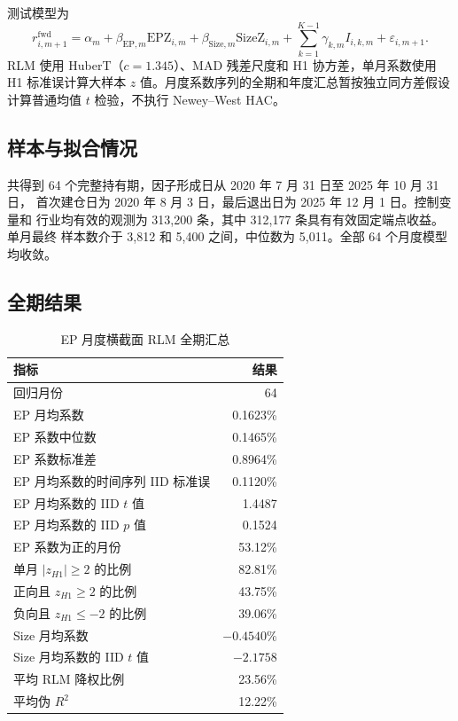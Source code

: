 \documentclass[UTF8,a4paper,11pt]{ctexart}
\begin{document}
测试模型为
\begin{equation}
  r^{\mathrm{fwd}}_{i,m+1}
  =\alpha_m+\beta_{\mathrm{EP},m}\mathrm{EPZ}_{i,m}
   +\beta_{\mathrm{Size},m}\mathrm{SizeZ}_{i,m}
   +\sum_{k=1}^{K-1}\gamma_{k,m}I_{i,k,m}
   +\varepsilon_{i,m+1}.
\end{equation}
RLM 使用 HuberT（$c=1.345$）、MAD 残差尺度和 H1 协方差，单月系数使用 H1
标准误计算大样本 $z$ 值。月度系数序列的全期和年度汇总暂按独立同方差假设
计算普通均值 $t$ 检验，不执行 Newey--West HAC。

\subsection{样本与拟合情况}

共得到 64 个完整持有期，因子形成日从 2020 年 7 月 31 日至 2025 年 10 月 31 日，
首次建仓日为 2020 年 8 月 3 日，最后退出日为 2025 年 12 月 1 日。控制变量和
行业均有效的观测为 313,200 条，其中 312,177 条具有有效固定端点收益。单月最终
样本数介于 3,812 和 5,400 之间，中位数为 5,011。全部 64 个月度模型均收敛。

\subsection{全期结果}

\begin{table}[H]
  \centering
  \caption{EP 月度横截面 RLM 全期汇总}
  \begin{tabular}{lr}
    \toprule
    指标 & 结果 \\
    \midrule
    回归月份 & 64 \\
    EP 月均系数 & 0.1623\% \\
    EP 系数中位数 & 0.1465\% \\
    EP 系数标准差 & 0.8964\% \\
    EP 月均系数的时间序列 IID 标准误 & 0.1120\% \\
    EP 月均系数的 IID $t$ 值 & 1.4487 \\
    EP 月均系数的 IID $p$ 值 & 0.1524 \\
    EP 系数为正的月份 & 53.12\% \\
    单月 $|z_{H1}|\geq2$ 的比例 & 82.81\% \\
    正向且 $z_{H1}\geq2$ 的比例 & 43.75\% \\
    负向且 $z_{H1}\leq-2$ 的比例 & 39.06\% \\
    Size 月均系数 & $-0.4540\%$ \\
    Size 月均系数的 IID $t$ 值 & $-2.1758$ \\
    平均 RLM 降权比例 & 23.56\% \\
    平均伪 $R^2$ & 12.22\% \\
    \bottomrule
  \end{tabular}
\end{table}
\end{document}
